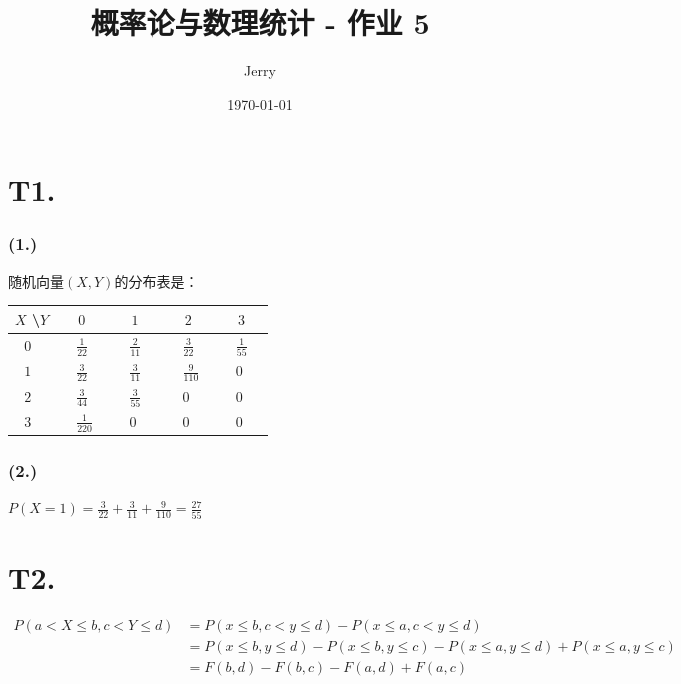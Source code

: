 \documentclass{article}
\title{\bf\huge 概率论与数理统计 - 作业 5}
\author{Jerry}
\date{\today}
\newcommand\f[2]{\frac{#1}{#2}}
\begin{document}
\maketitle

\section*{T1. }

\subsubsection*{(1.)}

随机向量$(X,Y)$的分布表是：

\begin{table}[H]
    \centering
    \begin{tabular}{|l|l|l|l|l|}
        \hline
        $X$ \textbackslash $Y$ & ~~$0$~~ & ~~$1$~~ & ~~$2$~~ & ~~$3$~~ \\ \hline
        $~~~0$ & ~~$\f{1}{22}$ & ~~$\f{2}{11}$ & ~~$\f{3}{22}$ & ~~$\f{1}{55}$ \\ \hline
        $~~~1$ & ~~$\f{3}{22}$ & ~~$\f{3}{11}$ & ~~$\f{9}{110}$ & ~~$0$ \\ \hline
        $~~~2$ & ~~$\f{3}{44}$ & ~~$\f{3}{55}$ & ~~$0$ & ~~$0$ \\ \hline
        $~~~3$ & ~~$\f{1}{220}$ & ~~$0$ & ~~$0$ & ~~$0$ \\ \hline
    \end{tabular}
\end{table}

\subsubsection*{(2.)}

$P(X=1)=\f{3}{22}+\f{3}{11}+\f{9}{110}=\f{27}{55}$

\section*{T2. }

\begin{equation}
    \begin{aligned}
        P(a < X \leq b, c < Y \leq d)
        & = P(x \leq b, c < y \leq d)-P(x \leq a, c < y \leq d)\\
        & = P(x \leq b, y \leq d)-P(x \leq b, y \leq c)-P(x \leq a, y \leq d)+P(x \leq a, y \leq c)\\
        & = F(b,d)-F(b,c)-F(a,d)+F(a,c)
    \end{aligned}
\end{equation}
\end{document}

